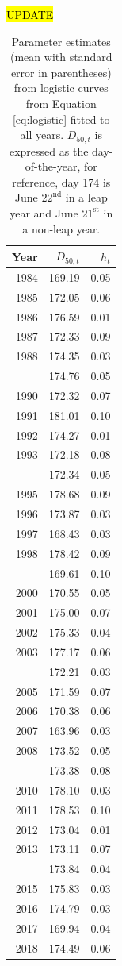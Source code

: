 \documentclass[12pt,]{book}
\theoremstyle{definition}
\theoremstyle{definition}
\theoremstyle{definition}
\theoremstyle{remark}
\begin{document}
\begin{singlespace}

\hl{UPDATE}

\begin{table}

\caption{\label{tab:rt-ests-table}Parameter estimates (mean with standard error in parentheses) from logistic curves from Equation \ref{eq:logistic} fitted to all years. $D_{50,t}$ is expressed as the day-of-the-year, for reference, day 174 is June $22^{\text{nd}}$ in a leap year and June $21^{\text{st}}$ in a non-leap year.}
\centering
\begin{tabular}[t]{rrr}
\toprule
Year & $D_{50,t}$ & $h_t$\\
\midrule
1984 & 169.19 & 0.05\\
1985 & 172.05 & 0.06\\
1986 & 176.59 & 0.01\\
1987 & 172.33 & 0.09\\
1988 & 174.35 & 0.03\\
\addlinespace
1989 & 174.76 & 0.05\\
1990 & 172.32 & 0.07\\
1991 & 181.01 & 0.10\\
1992 & 174.27 & 0.01\\
1993 & 172.18 & 0.08\\
\addlinespace
1994 & 172.34 & 0.05\\
1995 & 178.68 & 0.09\\
1996 & 173.87 & 0.03\\
1997 & 168.43 & 0.03\\
1998 & 178.42 & 0.09\\
\addlinespace
1999 & 169.61 & 0.10\\
2000 & 170.55 & 0.05\\
2001 & 175.00 & 0.07\\
2002 & 175.33 & 0.04\\
2003 & 177.17 & 0.06\\
\addlinespace
2004 & 172.21 & 0.03\\
2005 & 171.59 & 0.07\\
2006 & 170.38 & 0.06\\
2007 & 163.96 & 0.03\\
2008 & 173.52 & 0.05\\
\addlinespace
2009 & 173.38 & 0.08\\
2010 & 178.10 & 0.03\\
2011 & 178.53 & 0.10\\
2012 & 173.04 & 0.01\\
2013 & 173.11 & 0.07\\
\addlinespace
2014 & 173.84 & 0.04\\
2015 & 175.83 & 0.03\\
2016 & 174.79 & 0.03\\
2017 & 169.94 & 0.04\\
2018 & 174.49 & 0.06\\
\bottomrule
\end{tabular}
\end{table}

\end{singlespace}
\end{document}
